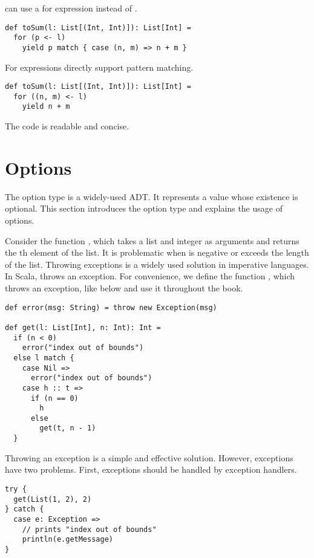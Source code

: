  can use a for expression instead of .

\begin{verbatim}
def toSum(l: List[(Int, Int)]): List[Int] =
  for (p <- l)
    yield p match { case (n, m) => n + m }
\end{verbatim}

For expressions directly support pattern matching.

\begin{verbatim}
def toSum(l: List[(Int, Int)]): List[Int] =
  for ((n, m) <- l)
    yield n + m
\end{verbatim}

The code is readable and concise.

\section{Options}

The option type is a widely-used ADT. It represents a value whose existence is
optional. This section introduces the option type and explains the usage of
options.

Consider the function , which takes a list and integer  as
arguments and returns the th element of the list. It is problematic
when  is negative or exceeds the length of the list. Throwing exceptions
is a widely used solution in imperative languages. In Scala,  throws an exception. For convenience, we define the function
, which throws an exception, like below and use it throughout the
book.

\begin{verbatim}
def error(msg: String) = throw new Exception(msg)

def get(l: List[Int], n: Int): Int =
  if (n < 0)
    error("index out of bounds")
  else l match {
    case Nil =>
      error("index out of bounds")
    case h :: t =>
      if (n == 0)
        h
      else
        get(t, n - 1)
  }
\end{verbatim}

Throwing an exception is a simple and effective solution. However, exceptions
have two problems. First, exceptions should be handled by exception handlers.

\begin{verbatim}
try {
  get(List(1, 2), 2)
} catch {
  case e: Exception =>
    // prints "index out of bounds"
    println(e.getMessage)
}
\end{verbatim}

